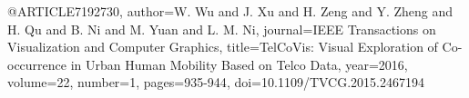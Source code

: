 @ARTICLE{7192730,
  author={W. {Wu} and J. {Xu} and H. {Zeng} and Y. {Zheng} and H. {Qu} and B. {Ni} and M. {Yuan} and L. M. {Ni}},
  journal={IEEE Transactions on Visualization and Computer Graphics}, 
  title={TelCoVis: Visual Exploration of Co-occurrence in Urban Human Mobility Based on Telco Data}, 
  year={2016},
  volume={22},
  number={1},
  pages={935-944},
  doi={10.1109/TVCG.2015.2467194}}
